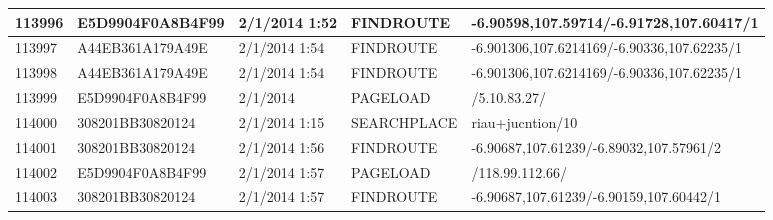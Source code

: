 \begin{longtable}{|p{1cm}|l|l|l|p{8cm}|}
113996         & E5D9904F0A8B4F99 & 2/1/2014 1:52            & FINDROUTE       & -6.90598,107.59714/-6.91728,107.60417/1                                                                                                                                                                               \\ \hline
113997         & A44EB361A179A49E & 2/1/2014 1:54            & FINDROUTE       & -6.901306,107.6214169/-6.90336,107.62235/1                                                                                                                                                                            \\ \hline
113998         & A44EB361A179A49E & 2/1/2014 1:54            & FINDROUTE       & -6.901306,107.6214169/-6.90336,107.62235/1                                                                                                                                                                            \\ \hline
113999         & E5D9904F0A8B4F99 & 2/1/2014                 & PAGELOAD        & /5.10.83.27/                                                                                                                                                                                                          \\ \hline
114000         & 308201BB30820124 & 2/1/2014 1:15            & SEARCHPLACE     & riau+jucntion/10                                                                                                                                                                                                      \\ \hline
114001         & 308201BB30820124 & 2/1/2014 1:56            & FINDROUTE       & -6.90687,107.61239/-6.89032,107.57961/2                                                                                                                                                                               \\ \hline
114002         & E5D9904F0A8B4F99 & 2/1/2014 1:57            & PAGELOAD        & /118.99.112.66/                                                                                                                                                                                                       \\ \hline
114003         & 308201BB30820124 & 2/1/2014 1:57            & FINDROUTE       & -6.90687,107.61239/-6.90159,107.60442/1                                                                                                                                                                               \\ \hline

\end{longtable}
